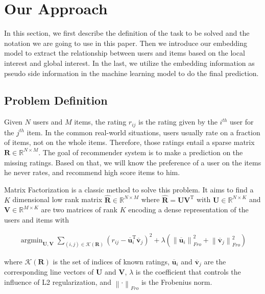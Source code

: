 \documentclass{sig-alternate-05-2015}
\DeclareMathOperator*{\argmin}{argmin}
\begin{document}
\section{Our Approach}
In this section,
we first describe the definition of the task to be solved and
the notation we are going to use in this paper. 
Then we introduce our embedding model to extract the relationship
between users and items based on the local interest and global interest.
In the last, we utilize the embedding information as pseudo side information
in the machine learning model to do the final prediction.

\subsection{Problem Definition}
Given $N$ users and $M$ items, the rating $r_{ij}$ is the rating given by
the $i^{th}$ user for the $j^{th}$ item.
In the common real-world situations,
users usually rate on a fraction of items, not on the whole items.
Therefore,
those ratings entail a sparse matrix $\mathbf{R} \in \mathbb{R}^{N \times M}$.
The goal of recommender system is to make a prediction on the missing ratings.
Based on that, we will know the preference of a user on the items he never rates,
and recommend high score items to him.

Matrix Factorization is a classic method to solve this problem.
It aims to find a $K$ dimensional low rank matrix $\mathbf{\hat{R}} \in \mathbb{R}^{N \times M}$
where $\mathbf{\hat{R}} = \mathbf{U} \mathbf{V}^\mathrm{T}$ with
$\mathbf{U} \in \mathbb{R}^{N \times K}$ and $\mathbf{V} \in \mathbb{R}^{M \times K}$
are two matrices of rank $K$ encoding a dense representation of the users and items with

\begin{equation}
\begin{aligned}
	\argmin_{\mathbf{U},\mathbf{V}}
	\sum_{(i,j) \in \mathcal{K}(\mathbf{R})}
	( r_{ij} - \overline{\mathbf{u}}_i^{\mathrm{T}} \overline{\mathbf{v}}_j ) ^ 2 +
	\lambda ( \left\| \overline{\mathbf{u}}_i \right\|_{Fro}^2 +
	\left\| \overline{\mathbf{v}}_j \right\|_{Fro}^2 )
\end{aligned}
\end{equation}

where $\mathcal{K}(\mathbf{R})$ is the set of indices of known ratings,
$\overline{\mathbf{u}}_i$ and $\overline{\mathbf{v}}_j$
are the corresponding line vectors of $\mathbf{U}$ and $\mathbf{V}$,
$\lambda$ is the coefficient that controls the influence of L2 regularization,
and $\left\| \cdot \right\|_{Fro}$ is the Frobenius norm.
\end{document}
